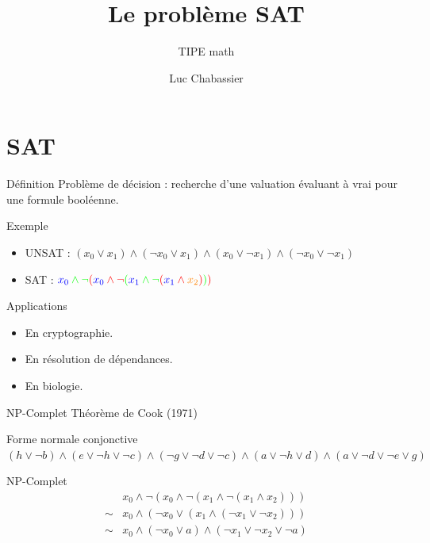 \documentclass{beamer}
\title{Le problème SAT}
\subtitle{TIPE math}
\author{Luc Chabassier}
\institute{Lycée Pierre de Fermat}
\begin{document}
\section{SAT}
\begin{frame}
    \maketitle
    \begin{block}{Définition}
        Problème de décision : recherche d'une valuation évaluant à vrai pour une formule booléenne.
    \end{block}

    \begin{exampleblock}{Exemple}
        \begin{itemize}
            \item UNSAT : $(x_0\vee x_1) \wedge (\neg x_0\vee x_1) \wedge (x_0\vee\neg x_1) \wedge (\neg x_0\vee\neg x_1)$
            \item SAT : ${\color{green}{\color{blue}x_0}\wedge\neg{\color{red}({\color{blue}x_0}\wedge\neg{\color{green}({\color{blue}x_1}\wedge\neg{\color{red}({\color{blue}x_1}\wedge {\color{orange}x_2})})})}}$
        \end{itemize}
    \end{exampleblock}
    \begin{exampleblock}{Applications}
        \begin{itemize}
            \item En cryptographie.
            \item En résolution de dépendances.
            \item En biologie.
        \end{itemize}
    \end{exampleblock}
    \begin{alertblock}{NP-Complet}
        Théorème de Cook (1971)
    \end{alertblock}
    \begin{exampleblock}{Forme normale conjonctive}
        $(h\vee\neg b) \wedge (e\vee\neg h\vee\neg c) \wedge (\neg g\vee\neg d\vee\neg c) \wedge (a\vee\neg h\vee d) \wedge (a\vee\neg d\vee\neg e\vee g)$
    \end{exampleblock}
    \begin{block}{NP-Complet}
        \[ \begin{array}{cl}
                & x_0 \wedge \neg(x_0 \wedge \neg(x_1 \wedge \neg (x_1 \wedge x_2))) \\
                \sim & x_0 \wedge (\neg x_0 \vee (x_1 \wedge (\neg x_1 \vee \neg x_2))) \\
                \sim & x_0 \wedge (\neg x_0 \vee a) \wedge (\neg x_1 \vee \neg x_2 \vee \neg a) \\
           \end{array}
        \]
    \end{block}
\end{frame}
\end{document}
